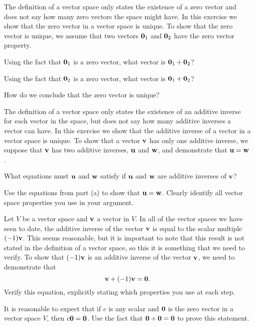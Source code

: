 \be
\item The definition of a vector space only states the existence of a zero vector and does not say how many zero vectors the space might have. In this exercise we show that the zero vector in a vector space is unique. To show that the zero vector is unique, we assume that two vectors $\mathbf{0}_1$ and $\mathbf{0}_2$ have the zero vector property.  
	\ba
	\item Using the fact that $\mathbf{0}_1$ is a zero vector, what vector is $\mathbf{0}_1 + \mathbf{0}_2$?

	\item Using the fact that $\mathbf{0}_2$ is a zero vector, what vector is $\mathbf{0}_1 + \mathbf{0}_2$? 

	\item How do we conclude that the zero vector is unique? 
	
	\ea


\item The definition of a vector space only states the existence of an additive inverse for each vector in the space, but does not say how many additive inverses a vector can have. In this exercise we show that the additive inverse of a vector in a vector space is unique. To show that a vector $\mathbf{v}$ has only one additive inverse, we suppose that $\mathbf{v}$ has two additive inverses, $\mathbf{u}$ and $\mathbf{w}$, and demonstrate that $\mathbf{u} = \mathbf{w}$. 
	\ba
	\item What equations must $\mathbf{u}$ and $\mathbf{w}$ satisfy if $\mathbf{u}$ and $\mathbf{w}$ are additive inverses of $\mathbf{v}$?
		
	\item Use the equations from part (a) to show that $\mathbf{u} = \mathbf{w}$. Clearly identify all vector space properties you use in your argument.

	\ea



\item Let $V$ be a vector space and $\mathbf{v}$ a vector in $V$. In all of the vector spaces we have seen to date, the additive inverse of the vector $\mathbf{v}$ is equal to the scalar multiple $(-1)\mathbf{v}$. This seems reasonable, but it is important to note that this result is not stated in the definition of a vector space, so this it is something that we need to verify. To show that $(-1)\mathbf{v}$ is an additive inverse of the vector $\mathbf{v}$, we need to demonstrate that 
\[\mathbf{v} + (-1)\mathbf{v} = \mathbf{0}.\]
Verify this equation, explicitly stating which properties you use at each step.

\item \label{ex:5_a_scalar_times_0} It is reasonable to expect that if $c$ is any scalar and $\mathbf{0}$ is the zero vector in a vector space $V$, then $c \mathbf{0} = \mathbf{0}$. Use the fact that $\mathbf{0} + \mathbf{0} = \mathbf{0}$ to prove this statement.


